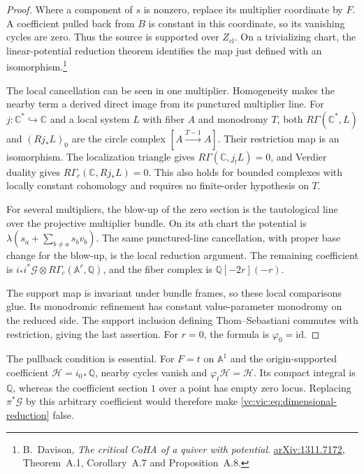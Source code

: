 \begin{proof}
Where a component of $s$ is nonzero, replace its multiplier
coordinate by $F$. A coefficient pulled back from $B$ is
constant in this coordinate, so its vanishing cycles are
zero. Thus the source is supported over $Z_{\mathrm{cl}}$.
On a trivializing chart, the linear-potential reduction
theorem identifies the map just defined with an
isomorphism.\footnote{B.~Davison, \emph{The critical CoHA
of a quiver with potential}.
\href{https://arxiv.org/abs/1311.7172}{arXiv:1311.7172},
Theorem~A.1, Corollary~A.7 and Proposition~A.8.}

The local cancellation can be seen in one multiplier.
Homogeneity makes the nearby term a derived direct image
from its punctured multiplier line. For
$j:\mathbb C^*\hookrightarrow\mathbb C$ and a local
system $L$ with fiber $A$ and monodromy $T$, both
$R\Gamma(\mathbb C^*,L)$ and $(Rj_*L)_0$ are the circle
complex $[A\xrightarrow{T-1}A]$.
Their restriction map is an isomorphism.
The localization triangle gives
$R\Gamma(\mathbb C,j_!L)=0$, and Verdier duality gives
$R\Gamma_c(\mathbb C,Rj_*L)=0$.
This also holds for bounded complexes with locally constant
cohomology and requires no finite-order hypothesis on $T$.

For several multipliers, the blow-up of the zero section
is the tautological line over the projective multiplier
bundle. On its $a$th chart the potential is
$\lambda(s_a+\sum_{b\ne a}s_bv_b)$.
The same punctured-line cancellation, with proper
base change for the blow-up, is the local reduction
argument. The remaining coefficient is
$i_*i^*\mathcal G\otimes R\Gamma_c(\mathbb A^r,\mathbb Q)$,
and the fiber complex is $\mathbb Q[-2r](-r)$.

The support map is invariant under bundle frames, so
these local comparisons glue. Its monodromic refinement
has constant value-parameter monodromy on the reduced
side. The support inclusion defining Thom--Sebastiani
commutes with restriction, giving the last assertion.
For $r=0$, the formula is $\varphi_0=\mathrm{id}$.
\end{proof}

The pullback condition is essential. For $F=t$ on
$\mathbb A^1$ and the origin-supported coefficient
$\mathcal H=i_{0*}\mathbb Q$, nearby cycles vanish and
$\varphi_t\mathcal H=\mathcal H$.
Its compact integral is $\mathbb Q$, whereas the
coefficient section $1$ over a point has empty zero locus.
Replacing $\pi^*\mathcal G$ by this arbitrary coefficient
would therefore make \eqref{vc:vic:eq:dimensional-reduction} false.


